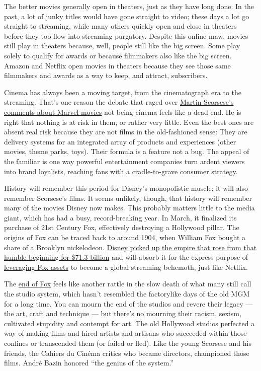 The better movies generally open in theaters, just as they have long
done. In the past, a lot of junky titles would have gone straight to
video; these days a lot go straight to streaming, while many others
quickly open and close in theaters before they too flow into streaming
purgatory. Despite this online maw, movies still play in theaters
because, well, people still like the big screen. Some play solely to
qualify for awards or because filmmakers also like the big screen.
Amazon and Netflix open movies in theaters because they see those same
filmmakers and awards as a way to keep, and attract, subscribers.

Cinema has always been a moving target, from the cinematograph era to
the streaming. That's one reason the debate that raged over
\href{https://www.nytimes.com/2019/11/04/opinion/martin-scorsese-marvel.html}{Martin
Scorsese's comments about Marvel movies} not being cinema feels like a
dead end. He is right that nothing is at risk in them, or rather very
little. Even the best ones are absent real risk because they are not
films in the old-fashioned sense: They are delivery systems for an
integrated array of products and experiences (other movies, theme parks,
toys). Their formula is a feature not a bug. The appeal of the familiar
is one way powerful entertainment companies turn ardent viewers into
brand loyalists, reaching fans with a cradle-to-grave consumer strategy.

History will remember this period for Disney's monopolistic muscle; it
will also remember Scorsese's films. It seems unlikely, though, that
history will remember many of the movies Disney now makes. This probably
matters little to the media giant, which has had a busy, record-breaking
year. In March, it finalized its purchase of 21st Century Fox,
effectively destroying a Hollywood pillar. The origins of Fox can be
traced back to around 1904, when William Fox bought a share of a
Brooklyn nickelodeon.
\href{https://www.nytimes.com/2019/03/20/business/media/walt-disney-21st-century-fox-deal.html}{Disney
picked up the empire that rose from that humble beginning for \$71.3
billion} and will absorb it for the express purpose of
\href{https://www.cnbc.com/2019/04/12/disney-wouldnt-have-bought-fox-assets-without-streaming-plans-iger-says.html}{leveraging
Fox assets} to become a global streaming behemoth, just like Netflix.

The
\href{https://variety.com/2019/film/news/fox-history-moments-disney-merger-1203165929/}{end
of Fox} feels like another rattle in the slow death of what many still
call the studio system, which hasn't resembled the factorylike days of
the old MGM for a long time. You can mourn the end of the studios and
revere their legacy --- the art, craft and technique --- but there's no
mourning their racism, sexism, cultivated stupidity and contempt for
art. The old Hollywood studios perfected a way of making films and hired
artists and artisans who succeeded within those confines or transcended
them (or failed or fled). Like the young Scorsese and his friends, the
Cahiers du Cinéma critics who became directors, championed those films.
André Bazin honored ``the genius of the system.''

